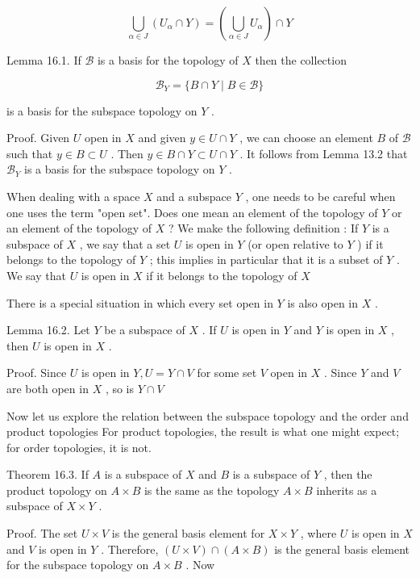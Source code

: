 \documentclass[10pt]{article}
\begin{document}
\[
\mathop{\bigcup }\limits_{{\alpha  \in  J}}\left( {{U}_{\alpha } \cap  Y}\right)  = \left( {\mathop{\bigcup }\limits_{{\alpha  \in  J}}{U}_{\alpha }}\right)  \cap  Y
\]

Lemma 16.1. If \(\mathcal{B}\) is a basis for the topology of \(X\) then the collection

\[
{\mathcal{B}}_{Y} = \{ B \cap  Y \mid  B \in  \mathcal{B}\}
\]

is a basis for the subspace topology on \(Y\) .

Proof. Given \(U\) open in \(X\) and given \(y \in  U \cap  Y\) , we can choose an element \(B\) of \(\mathcal{B}\) such that \(y \in  B \subset  U\) . Then \(y \in  B \cap  Y \subset  U \cap  Y\) . It follows from Lemma 13.2 that \({\mathcal{B}}_{Y}\) is a basis for the subspace topology on \(Y\) .

When dealing with a space \(X\) and a subspace \(Y\) , one needs to be careful when one uses the term "open set". Does one mean an element of the topology of \(Y\) or an element of the topology of \(X\) ? We make the following definition : If \(Y\) is a subspace of \(X\) , we say that a set \(U\) is open in \(Y\) (or open relative to \(Y\) ) if it belongs to the topology of \(Y\) ; this implies in particular that it is a subset of \(Y\) . We say that \(U\) is open in \(X\) if it belongs to the topology of \(X\)

There is a special situation in which every set open in \(Y\) is also open in \(X\) .

Lemma 16.2. Let \(Y\) be a subspace of \(X\) . If \(U\) is open in \(Y\) and \(Y\) is open in \(X\) , then \(U\) is open in \(X\) .

Proof. Since \(U\) is open in \(Y,U = Y \cap  V\) for some set \(V\) open in \(X\) . Since \(Y\) and \(V\) are both open in \(X\) , so is \(Y \cap  V\)

Now let us explore the relation between the subspace topology and the order and product topologies For product topologies, the result is what one might expect; for order topologies, it is not.

Theorem 16.3. If \(A\) is a subspace of \(X\) and \(B\) is a subspace of \(Y\) , then the product topology on \(A \times  B\) is the same as the topology \(A \times  B\) inherits as a subspace of \(X \times  Y\) .

Proof. The set \(U \times  V\) is the general basis element for \(X \times  Y\) , where \(U\) is open in \(X\) and \(V\) is open in \(Y\) . Therefore, \(\left( {U \times  V}\right)  \cap  \left( {A \times  B}\right)\) is the general basis element for the subspace topology on \(A \times  B\) . Now
\end{document}
